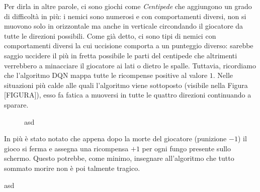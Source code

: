 \documentclass[twoside,twocolumn,10pt]{extarticle}
\theoremstyle{definition}
\begin{document}
		Per dirla in altre parole, ci sono giochi come \textit{Centipede} che aggiungono un grado di difficoltà in più: i nemici sono numerosi e con comportamenti diversi, non si muovono solo in orizzontale ma anche in verticale circondando il giocatore da tutte le direzioni possibili. Come già detto, ci sono tipi di nemici con comportamenti diversi la cui uccisione comporta a un punteggio diverso: sarebbe saggio uccidere il più in fretta possibile le parti del centipede che altrimenti verrebbero a minacciare il giocatore ai lati o dietro le spalle. Tuttavia, ricordiamo che l'algoritmo DQN mappa tutte le ricompense positive al valore $1$. Nelle situazioni più calde alle quali l'algoritmo viene sottoposto (visibile nella Figura [FIGURA]), esso fa fatica a muoversi in tutte le quattro direzioni continuando a sparare.
	
		\begin{figure}[ht!]
			\centering
			\caption{asd}
			\label{fig:centipede}
		\end{figure}
	
		In più è stato notato che appena dopo la morte del giocatore (punizione $-1$) il gioco si ferma e assegna una ricompensa $+1$ per ogni fungo presente sullo schermo. Questo potrebbe, come minimo, insegnare all'algoritmo che tutto sommato morire non è poi talmente tragico.
		
		
	
	\begin{table}[h]
		\centering
		\caption{asd}
		
		\label{tab:gerarchia}
	\end{table}		
		
\end{document}
